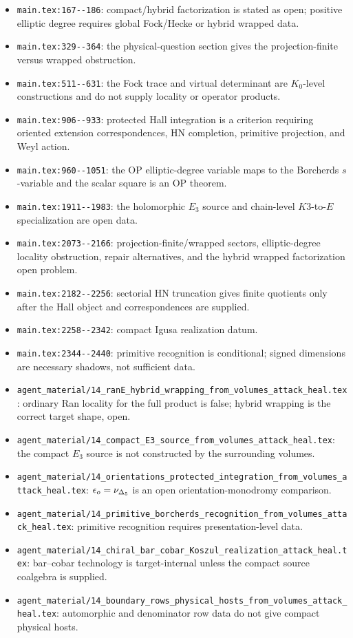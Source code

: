 \begin{itemize}
\item \verb|main.tex:167--186|: compact/hybrid factorization is stated
as open; positive elliptic degree requires global Fock/Hecke or hybrid
wrapped data.
\item \verb|main.tex:329--364|: the physical-question section gives the
projection-finite versus wrapped obstruction.
\item \verb|main.tex:511--631|: the Fock trace and virtual determinant
are \(K_0\)-level constructions and do not supply locality or operator
products.
\item \verb|main.tex:906--933|: protected Hall integration is a
criterion requiring oriented extension correspondences, HN completion,
primitive projection, and Weyl action.
\item \verb|main.tex:960--1051|: the OP elliptic-degree variable maps to
the Borcherds \(s\)-variable and the scalar square is an OP theorem.
\item \verb|main.tex:1911--1983|: the holomorphic \(E_3\) source and
chain-level \(K3\)-to-\(E\) specialization are open data.
\item \verb|main.tex:2073--2166|: projection-finite/wrapped sectors,
elliptic-degree locality obstruction, repair alternatives, and the
hybrid wrapped factorization open problem.
\item \verb|main.tex:2182--2256|: sectorial HN truncation gives finite
quotients only after the Hall object and correspondences are supplied.
\item \verb|main.tex:2258--2342|: compact Igusa realization datum.
\item \verb|main.tex:2344--2440|: primitive recognition is conditional;
signed dimensions are necessary shadows, not sufficient data.
\item \verb|agent_material/14_ranE_hybrid_wrapping_from_volumes_attack_heal.tex|:
ordinary Ran locality for the full product is false; hybrid wrapping is
the correct target shape, open.
\item \verb|agent_material/14_compact_E3_source_from_volumes_attack_heal.tex|:
the compact \(E_3\) source is not constructed by the surrounding
volumes.
\item \verb|agent_material/14_orientations_protected_integration_from_volumes_attack_heal.tex|:
\(\epsilon_o=\nu_{\Delta_5}\) is an open orientation-monodromy comparison.
\item \verb|agent_material/14_primitive_borcherds_recognition_from_volumes_attack_heal.tex|:
primitive recognition requires presentation-level data.
\item \verb|agent_material/14_chiral_bar_cobar_Koszul_realization_attack_heal.tex|:
bar--cobar technology is target-internal unless the compact source
coalgebra is supplied.
\item \verb|agent_material/14_boundary_rows_physical_hosts_from_volumes_attack_heal.tex|:
automorphic and denominator row data do not give compact physical hosts.
\end{itemize}


